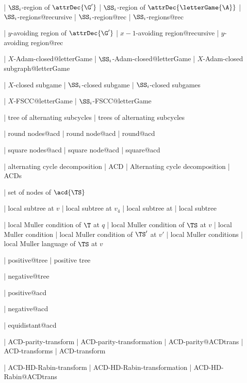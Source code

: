  | $\SS _i$-region of $\attrDec {\G '}$
 | $\SS _i$-region of $\attrDec {\letterGame {\A }}$
 | $\SS _i$-regions@recursive
 | $\SS _i$-region@rec
 | $\SS _i$-regions@rec

 
| $y$-avoiding region of $\attrDec {\G '}$
| $x-1$-avoiding region@recursive
| $y$-avoiding region@rec

  

| $X$-Adam-closed@letterGame
| $\SS _i$-Adam-closed@letterGame
| $X$-Adam-closed subgraph@letterGame
  
  | $X$-closed subgame
  | $\SS _i$-closed subgame
  | $\SS _i$-closed subgames

  | $X$-FSCC@letterGame
  | $\SS _i$-FSCC@letterGame


  
  | tree of alternating subcycles
  | trees of alternating subcycles

  | round nodes@acd
  | round node@acd
  | round@acd

  | square nodes@acd
  | square node@acd
  | square@acd
  
  | alternating cycle decomposition
  | ACD
  | Alternating cycle decomposition
  | ACDs

  
  | set of nodes of $\acd {\TS }$

  | local subtree at $v$
  | local subtree at $v_4$
  | local subtree at
  | local subtree


| local Muller condition of $\T $ at $q$
| local Muller condition of $\TS $ at $v$
| local Muller condition
| local Muller condition of $\TS '$ at $v'$
| local Muller conditions
| local Muller language of $\TS $ at $v$
  

  | positive@tree
  | positive tree
 

  | negative@tree

  | positive@acd

  | negative@acd

  | equidistant@acd

  | ACD-parity-transform
  | ACD-parity-transformation
  | ACD-parity@ACDtrans
  | ACD-transforms
  | ACD-transform
  
  
  | ACD-HD-Rabin-transform
  | ACD-HD-Rabin-transformation
  | ACD-HD-Rabin@ACDtrans
  
